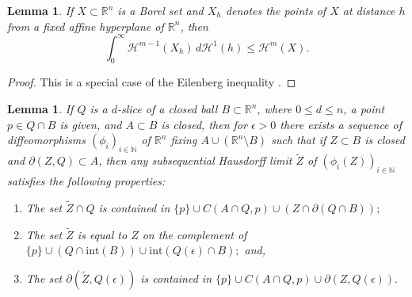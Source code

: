 \documentclass[10pt]{amsart}
\newtheorem{lem}[thm]{Lemma}
\theoremstyle{definition}
\theoremstyle{definition}
\theoremstyle{definition}
\theoremstyle{definition}
\theoremstyle{definition}
\theoremstyle{definition}
\theoremstyle{definition}
\newcommand{\R}{\ensuremath{\mathbb{R}}}
\newcommand{\N}{\ensuremath{\mathbb{N}}}
\newcommand{\<}{\langle}
\renewcommand{\>}{\rangle}
\def\i{\infty}
\def\fr{\partial}
\def\e{\epsilon}
\def\H{\mathcal{H}}
\begin{document}
\begin{lem}
	\label{lem:4}
	If \( X\subset \R^n \) is a Borel set and \( X_h \) denotes the points of \( X \) at distance \( h \) from a fixed affine hyperplane of \( \R^n \), then \[ \int_0^\i \H^{m-1} (X_h) \,d\H^1(h) \leq \H^m (X). \]
\end{lem}

\begin{proof}
	This is a special case of the Eilenberg inequality \cite{eilenberg}.
\end{proof}

\begin{lem}
	\label{lem:2}
	If \( Q \) is a \( d \)-slice of a closed ball \( B\subset \R^n \), where \( 0\leq d \leq n \), a point \( p \in Q\cap B \) is given, and \( A\subset B \) is closed, then for \( \e>0 \) there exists a sequence of diffeomorphisms \( (\phi_i)_{i\in \N} \) of \( \R^n \) fixing \( A\cup (\R^n\setminus B) \) such that if \( Z\subset B \) is closed and \( \fr(Z,Q)\subset A \), then any subsequential Hausdorff limit \( \tilde{Z} \) of \( (\phi_i(Z))_{i\in \N} \) satisfies the following properties:
	\begin{enumerate}
		\item\label{lem:2:item:1} The set \( \tilde{Z}\cap Q \) is contained in \( \{p\}\cup C(A\cap Q,p) \cup (Z\cap \fr(Q\cap B)); \)
		\item\label{lem:2:item:2} The set \( \tilde{Z} \) is equal to \( Z \) on the complement of \( \{p\}\cup\left(Q\cap\textrm{int}(B)\right)\cup \textrm{int}\left(Q(\e)\cap B\right); \) and,
		\item\label{lem:2:item:3} The set \( \fr(\tilde{Z},Q(\e)) \) is contained in \( \{p\}\cup C(A\cap Q,p)\cup \fr(Z,Q(\e)). \)
	\end{enumerate}
\end{lem}
\end{document}
